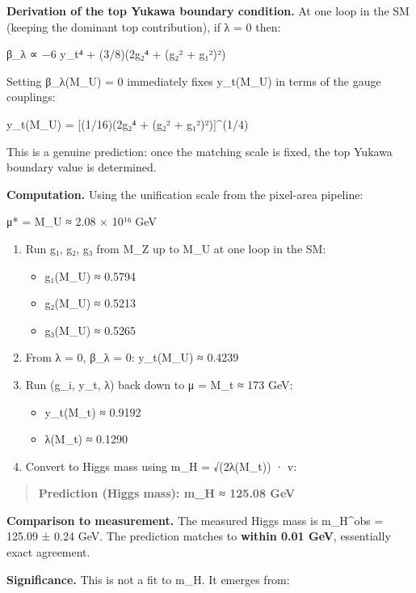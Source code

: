 \textbf{Derivation of the top Yukawa boundary condition.} At one loop in the SM (keeping the dominant top contribution), if λ = 0 then:

β\_λ ∝ −6 y\_t⁴ + (3/8)(2g₂⁴ + (g₂² + g₁²)²)

Setting β\_λ(M\_U) = 0 immediately fixes y\_t(M\_U) in terms of the gauge couplings:

y\_t(M\_U) = {[}(1/16)(2g₂⁴ + (g₂² + g₁²)²){]}\^{}(1/4)

This is a genuine prediction: once the matching scale is fixed, the top Yukawa boundary value is determined.

\textbf{Computation.} Using the unification scale from the pixel-area pipeline:

μ* = M\_U ≈ 2.08 × 10¹⁶ GeV

\begin{enumerate}
\def\labelenumi{\arabic{enumi}.}
\item
  Run g₁, g₂, g₃ from M\_Z up to M\_U at one loop in the SM:

  \begin{itemize}
  \tightlist
  \item
    g₁(M\_U) ≈ 0.5794
  \item
    g₂(M\_U) ≈ 0.5213
  \item
    g₃(M\_U) ≈ 0.5265
  \end{itemize}
\item
  From λ = 0, β\_λ = 0: y\_t(M\_U) ≈ 0.4239
\item
  Run (g\_i, y\_t, λ) back down to μ = M\_t ≈ 173 GeV:

  \begin{itemize}
  \tightlist
  \item
    y\_t(M\_t) ≈ 0.9192
  \item
    λ(M\_t) ≈ 0.1290
  \end{itemize}
\item
  Convert to Higgs mass using m\_H = √(2λ(M\_t)) · v:
\end{enumerate}

\begin{quote}
\textbf{Prediction (Higgs mass): m\_H ≈ 125.08 GeV}
\end{quote}

\textbf{Comparison to measurement.} The measured Higgs mass is m\_H\^{}obs = 125.09 ± 0.24 GeV. The prediction matches to \textbf{within 0.01 GeV}, essentially exact agreement.

\textbf{Significance.} This is not a fit to m\_H. It emerges from:

